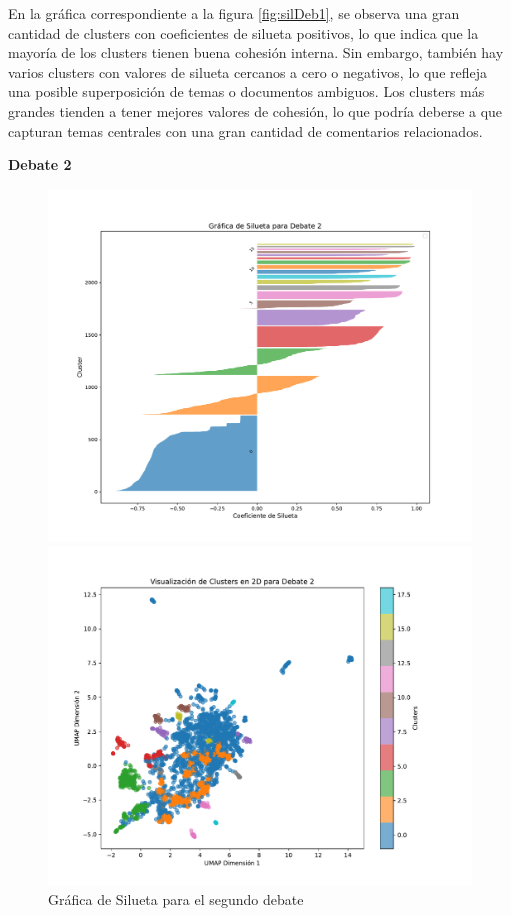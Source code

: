 \documentclass[10pt, a4paper]{article}
\begin{document}
	En la gráfica correspondiente a la figura \ref{fig:silDeb1}, se observa una gran cantidad de clusters con coeficientes de silueta positivos, lo que indica que la mayoría de los clusters tienen buena cohesión interna. Sin embargo, también hay varios clusters con valores de silueta cercanos a cero o negativos, lo que refleja una posible superposición de temas o documentos ambiguos. Los clusters más grandes tienden a tener mejores valores de cohesión, lo que podría deberse a que capturan temas centrales con una gran cantidad de comentarios relacionados.
	
	\vspace{4mm}
	\textbf{Debate 2}

	\begin{figure}[h!]
		\centering
		\begin{minipage}{0.49\textwidth} %
			\includegraphics[width=\linewidth]{silhouette_debate2.pdf} 
			\caption{Gráfica de Silueta para el segundo debate}
			\label{fig:silDeb2}
		\end{minipage}
		\hfill %
		\begin{minipage}{0.49\textwidth}
			\includegraphics[width=\linewidth]{clusters_debate2.pdf}

\end{minipage}
\end{figure}
\end{document}
